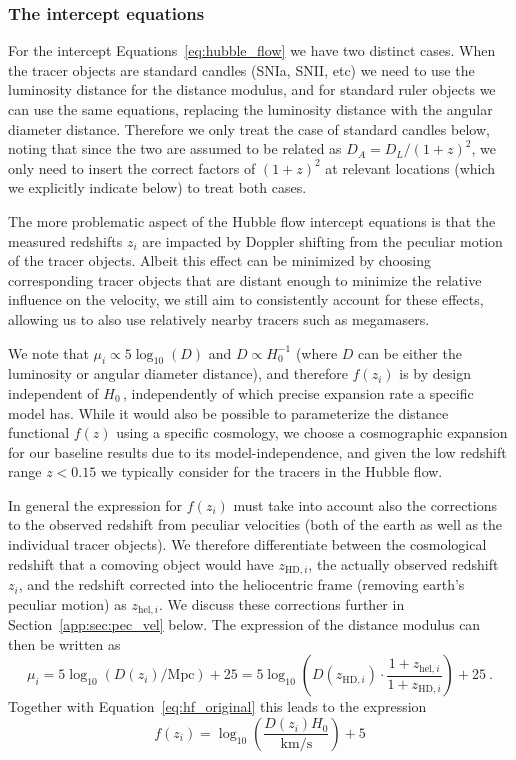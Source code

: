\subsubsection{The intercept equations}\label{app:sec:intercept}
For the intercept Equations~\ref{eq:hubble_flow} we have two distinct cases. When the tracer objects are standard candles (SNIa, SNII, etc) we need to use the luminosity distance for the distance modulus, and for standard ruler objects we can use the same equations, replacing the luminosity distance with the angular diameter distance. Therefore we only treat the case of standard candles below, noting that since the two are assumed to be related as $D_A = D_L /(1+z)^2$, we only need to insert the correct factors of $(1+z)^2$ at relevant locations (which we explicitly indicate below) to treat both cases.

The more problematic aspect of the Hubble flow intercept equations is that the measured redshifts $z_i$ are impacted by Doppler shifting from the peculiar motion of the tracer objects. Albeit this effect can be minimized by choosing corresponding tracer objects that are distant enough to minimize the relative influence on the velocity, we still aim to consistently account for these effects, allowing us to also use relatively nearby tracers such as megamasers.

We note that $\mu_i \propto 5 \log_{10}(D)$ and $D \propto H_0^{-1}$ (where $D$ can be either the luminosity or angular diameter distance), and therefore $f(z_i)$ is by design independent of $H_0$\,, independently of which precise expansion rate a specific model has. While it would also be possible to parameterize the distance functional $f(z)$ using a specific cosmology, we choose a cosmographic expansion for our baseline results due to its model-independence, and given the low redshift range $z<0.15$ we typically consider for the tracers in the Hubble flow.

In general the expression for $f(z_i)$ must take into account also the corrections to the observed redshift from peculiar velocities (both of the earth as well as the individual tracer objects). We therefore differentiate between the cosmological redshift that a comoving object would have $z_{\mathrm{HD},i}$, the actually observed redshift $z_i$, and the redshift corrected into the heliocentric frame (removing earth's peculiar motion) as $z_{\mathrm{hel},i}$. We discuss these corrections further in Section~\ref{app:sec:pec_vel} below. The expression of the distance modulus can then be written as \citet{2011ApJ...741...67D,2017JCAP...01..038C}
\begin{equation}
    \mu_i = 5\log_{10}(D(z_i)/\mathrm{Mpc})+25 = 5\log_{10}\left(D(z_{\mathrm{HD},i}) \cdot \frac{1+z_{\mathrm{hel},i}}{1+z_{\mathrm{HD},i}}\right) + 25~.\label{eq:distance_modulus}
\end{equation}
Together with Equation~\ref{eq:hf_original} this leads to the expression
\begin{equation}
    f(z_i) = \log_{10}\left(\frac{D(z_i) H_0}{\mathrm{km/s}}\right)+5 \label{eq:hf_f_of_z}
\end{equation}

